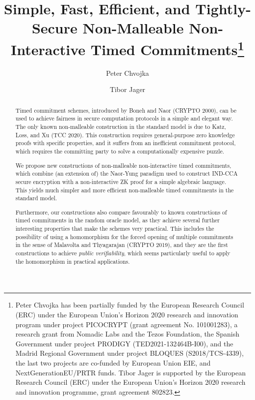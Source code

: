 \documentclass{llncs}
\author{\vspace{-5mm}}
\institute{\vspace{-5mm}}
\author{Peter Chvojka\inst{1} \and Tibor Jager\inst{2}}
\institute{IMDEA Software Institute, \url{chvojka.p@gmail.com} \and University of Wuppertal, \url{jager@uni-wuppertal.de}}
\begin{document}
\title{Simple, Fast, Efficient, and Tightly-Secure Non-Malleable Non-Interactive Timed Commitments\thanks{Peter Chvojka has been partially funded by the European Research Council (ERC) under the European Union’s Horizon 2020 research and innovation program under project PICOCRYPT (grant agreement No. 101001283), a research grant from Nomadic Labs and the Tezos Foundation, the Spanish Government under project PRODIGY (TED2021-132464B-I00), and the Madrid Regional Government under project BLOQUES (S2018/TCS-4339), the last two projects are co-funded by European Union EIE, and NextGenerationEU/PRTR funds.
Tibor Jager is supported by the European Research Council (ERC) under the European Union's Horizon 2020 research and innovation programme, grant agreement 802823.}}



\maketitle
\begin{abstract}
Timed commitment schemes, introduced by Boneh and Naor (CRYPTO 2000), can be used to achieve fairness in secure computation protocols in a simple and elegant way.
The only known non-malleable construction in the standard model is due to Katz, Loss, and Xu (TCC 2020). This construction requires general-purpose zero knowledge proofs with specific properties, and it suffers from an inefficient commitment protocol, which requires the committing party to solve a computationally expensive puzzle.

We propose new constructions of non-malleable non-interactive timed commitments, which combine (an extension of) the Naor-Yung paradigm used to construct IND-CCA secure encryption with a non-interactive ZK proof for a simple algebraic language. This yields much simpler and more efficient non-malleable timed commitments in the standard model.

Furthermore, our constructions also compare favourably to known constructions of timed commitments in the random oracle model, as they achieve several further interesting properties that make the schemes very practical. This includes the possibility of using a homomorphism for the forced opening of multiple commitments in the sense of Malavolta and Thyagarajan (CRYPTO 2019), and they are the first constructions to achieve \emph{public verifiability}, which seems particularly useful to apply the homomorphism in practical applications.
\end{abstract}
\end{document}
